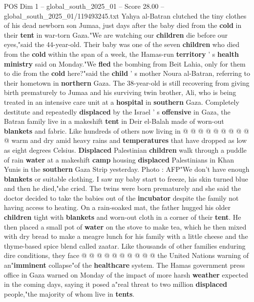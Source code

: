 \begin{textsample}{POS Dim 1 – global\_south\_2025\_01 – Score 28.00 – global\_south\_2025\_01/119493245.txt}  \label{ex:f1_pos_297}
Yahya al-Batran clutched the tiny clothes of his dead newborn son Jumaa, just days after the baby died from the \textbf{cold} in their \textbf{tent} in war-torn Gaza."We are watching our \textbf{children} die before our eyes,"said the 44-year-old.
Their baby was one of the seven \textbf{children} who died from the \textbf{cold} within the span of a week, the Hamas-run \textbf{territory} ' s \textbf{health} \textbf{ministry} said on Monday."We \textbf{fled} the bombing from Beit Lahia, only for them to die from the \textbf{cold} here?"said the \textbf{child} ' s mother Noura al-Batran, referring to their hometown in \textbf{northern} Gaza.
The 38-year-old is still recovering from giving birth prematurely to Jumaa and his surviving twin brother, Ali, who is being treated in an intensive care unit at a \textbf{hospital} in \textbf{southern} Gaza.
Completely destitute and repeatedly \textbf{displaced} by the Israel ' s \textbf{offensive} in Gaza, the Batran family live in a makeshift \textbf{tent} in Deir el-Balah made of worn-out \textbf{blankets} and fabric.
Like hundreds of others now living in @ @ @ @ @ @ @ @ @ @ warm and dry amid heavy rains and \textbf{temperatures} that have dropped as low as eight degrees Celsius. \textbf{Displaced} Palestinian \textbf{children} walk through a puddle of rain \textbf{water} at a makeshift \textbf{camp} housing \textbf{displaced} Palestinians in Khan Yunis in the \textbf{southern} Gaza Strip yesterday.
Photo : AFP"We don't have enough \textbf{blankets} or suitable clothing.
I saw my baby start to freeze, his skin turned blue and then he died,"she cried.
The twins were born prematurely and she said the doctor decided to take the babies out of the \textbf{incubator} despite the family not having access to heating.
On a rain-soaked mat, the father hugged his older \textbf{children} tight with \textbf{blankets} and worn-out cloth in a corner of their \textbf{tent}.
He then placed a small pot of \textbf{water} on the stove to make tea, which he then mixed with dry bread to make a meagre lunch for his family with a little cheese and the thyme-based spice blend called zaatar.
Like thousands of other families enduring dire conditions, they face @ @ @ @ @ @ @ @ @ @ the United Nations warning of an"\textbf{imminent} collapse"of the \textbf{healthcare} system.
The Hamas government press office in Gaza warned on Monday of the impact of more harsh \textbf{weather} expected in the coming days, saying it posed a"real threat to two million \textbf{displaced} people,"the majority of whom live in \textbf{tents}.

\end{textsample}
